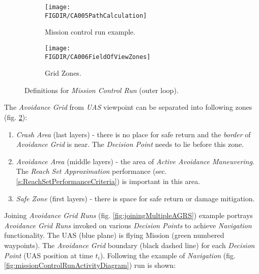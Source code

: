 \begin{figure}[H]
    \centering
    \begin{subfigure}{0.48\textwidth}
        \centering
        \texttt{[image: \\FIGDIR/CA005PathCalculation]}
        \caption{Mission control run example.}
        \label{fig:missionControlRunExample}
    \end{subfigure}
    \begin{subfigure}{0.48\textwidth}
    	\centering
        \texttt{[image: \\FIGDIR/CA006FieldOfViewZones]} 
        \caption{Grid Zones.}
        \label{fig:gridZonesMissionControl}
    \end{subfigure}
    \caption{Definitions for \emph{Mission Control Run} (outer loop).}
    \label{fig:definitionsForMissionControlRun}
\end{figure}

\noindent The \emph{Avoidance Grid} from \emph{UAS} viewpoint can be separated into following zones (fig. \ref{fig:gridZonesMissionControl}):
\begin{enumerate}
    \item \emph{Crash Area} (last layers) - there is no place for safe return and the \emph{border} of \emph{Avoidance Grid} is near. The \emph{Decision Point} needs to lie before this zone.
    
    \item \emph{Avoidance Area} (middle layers) - the area of \emph{Active Avoidance Maneuvering}. The \emph{Reach Set Approximation} performance (sec. \ref{s:ReachSetPerformanceCriteria}) is important in this area.
    
    \item \emph{Safe Zone} (first layers) - there is space for safe return or damage mitigation.
\end{enumerate}



\noindent Joining \emph{Avoidance Grid Runs} (fig. \ref{fig:joiningMultipleAGRS})  example portrays \emph{Avoidance Grid Runs} invoked on various \emph{Decision Points} to achieve \emph{Navigation} functionality. The UAS (blue plane) is flying Mission (green numbered waypoints). The \emph{Avoidance Grid} boundary (black dashed line) for each \emph{Decision Point} (UAS position at time $t_i$). Following the example of \emph{Navigation} (fig. \ref{fig:missionControlRunActivityDiagram}) run is shown:

